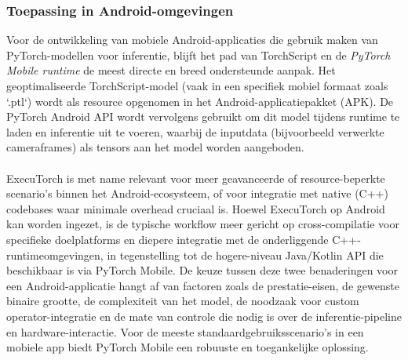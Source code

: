 \subsubsection{Toepassing in Android-omgevingen}
\label{sssec:toepassing-android}

Voor de ontwikkeling van mobiele Android-applicaties die gebruik maken van PyTorch-modellen voor inferentie, blijft het pad van TorchScript en de \textit{PyTorch Mobile runtime} de meest directe en breed ondersteunde aanpak.
Het geoptimaliseerde TorchScript-model (vaak in een specifiek mobiel formaat zoals `.ptl`) wordt als resource opgenomen in het Android-applicatiepakket (APK).
De PyTorch Android API wordt vervolgens gebruikt om dit model tijdens runtime te laden en inferentie uit te voeren, waarbij de inputdata (bijvoorbeeld verwerkte cameraframes) als tensors aan het model worden aangeboden.
\\
\\
ExecuTorch is met name relevant voor meer geavanceerde of resource-beperkte scenario's binnen het Android-ecosysteem, of voor integratie met native (C++) codebases waar minimale overhead cruciaal is.
Hoewel ExecuTorch op Android kan worden ingezet, is de typische workflow meer gericht op cross-compilatie voor specifieke doelplatforms en diepere integratie met de onderliggende C++-runtimeomgevingen, in tegenstelling tot de hogere-niveau Java/Kotlin API die beschikbaar is via PyTorch Mobile.
De keuze tussen deze twee benaderingen voor een Android-applicatie hangt af van factoren zoals de prestatie-eisen, de gewenste binaire grootte, de complexiteit van het model, de noodzaak voor custom operator-integratie en de mate van controle die nodig is over de inferentie-pipeline en hardware-interactie.
Voor de meeste standaardgebruiksscenario's in een mobiele app biedt PyTorch Mobile een robuuste en toegankelijke oplossing.
